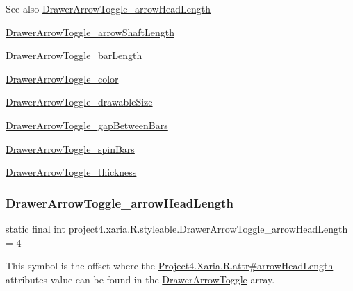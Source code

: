 \begin{DoxySeeAlso}{See also}
\hyperlink{classproject4_1_1xaria_1_1R_1_1styleable_a457594739477bbef860905dc8962ed87}{Drawer\+Arrow\+Toggle\+\_\+arrow\+Head\+Length} 

\hyperlink{classproject4_1_1xaria_1_1R_1_1styleable_a49fc6620d696930dca13977825e4fc11}{Drawer\+Arrow\+Toggle\+\_\+arrow\+Shaft\+Length} 

\hyperlink{classproject4_1_1xaria_1_1R_1_1styleable_a5812c605567372cd810d538d94b94d2f}{Drawer\+Arrow\+Toggle\+\_\+bar\+Length} 

\hyperlink{classproject4_1_1xaria_1_1R_1_1styleable_a5ca52cb75917a6d3666d5120613e3f97}{Drawer\+Arrow\+Toggle\+\_\+color} 

\hyperlink{classproject4_1_1xaria_1_1R_1_1styleable_a9c3f73891dd5a4d60247e34fefb8c47a}{Drawer\+Arrow\+Toggle\+\_\+drawable\+Size} 

\hyperlink{classproject4_1_1xaria_1_1R_1_1styleable_a8d472cd739b04305b3402c6232122cb4}{Drawer\+Arrow\+Toggle\+\_\+gap\+Between\+Bars} 

\hyperlink{classproject4_1_1xaria_1_1R_1_1styleable_a677c43a06f3156ddaadcaf41f4a5f63a}{Drawer\+Arrow\+Toggle\+\_\+spin\+Bars} 

\hyperlink{classproject4_1_1xaria_1_1R_1_1styleable_ada3e7dfa18bdce491e278c71b0c30013}{Drawer\+Arrow\+Toggle\+\_\+thickness} 
\end{DoxySeeAlso}
\mbox{\label{classproject4_1_1xaria_1_1R_1_1styleable_a457594739477bbef860905dc8962ed87}} 
\subsubsection{\texorpdfstring{Drawer\+Arrow\+Toggle\+\_\+arrow\+Head\+Length}{DrawerArrowToggle\_arrowHeadLength}}
{\footnotesize\ttfamily static final int project4.\+xaria.\+R.\+styleable.\+Drawer\+Arrow\+Toggle\+\_\+arrow\+Head\+Length = 4\hspace{0.3cm}{\ttfamily [static]}}

This symbol is the offset where the \hyperlink{}{Project4.\+Xaria.\+R.\+attr\#arrow\+Head\+Length} attribute\textquotesingle{}s value can be found in the \hyperlink{classproject4_1_1xaria_1_1R_1_1styleable_aa8594da8de0b2617c3d5cd5e028f8b77}{Drawer\+Arrow\+Toggle} array.

